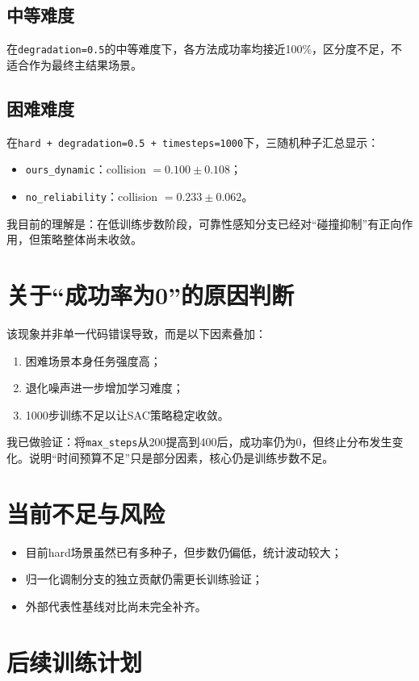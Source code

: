 \subsection{中等难度}
在\texttt{degradation=0.5}的中等难度下，各方法成功率均接近100\%，区分度不足，不适合作为最终主结果场景。

\subsection{困难难度}
在\texttt{hard + degradation=0.5 + timesteps=1000}下，三随机种子汇总显示：
\begin{itemize}
    \item \texttt{ours\_dynamic}：collision $=0.100\pm0.108$；
    \item \texttt{no\_reliability}：collision $=0.233\pm0.062$。
\end{itemize}
我目前的理解是：在低训练步数阶段，可靠性感知分支已经对“碰撞抑制”有正向作用，但策略整体尚未收敛。

\section{关于“成功率为0”的原因判断}
该现象并非单一代码错误导致，而是以下因素叠加：
\begin{enumerate}
    \item 困难场景本身任务强度高；
    \item 退化噪声进一步增加学习难度；
    \item 1000步训练不足以让SAC策略稳定收敛。
\end{enumerate}

我已做验证：将\texttt{max\_steps}从200提高到400后，成功率仍为0，但终止分布发生变化。说明“时间预算不足”只是部分因素，核心仍是训练步数不足。

\section{当前不足与风险}
\begin{itemize}
    \item 目前hard场景虽然已有多种子，但步数仍偏低，统计波动较大；
    \item 归一化调制分支的独立贡献仍需更长训练验证；
    \item 外部代表性基线对比尚未完全补齐。
\end{itemize}

\section{后续训练计划}
